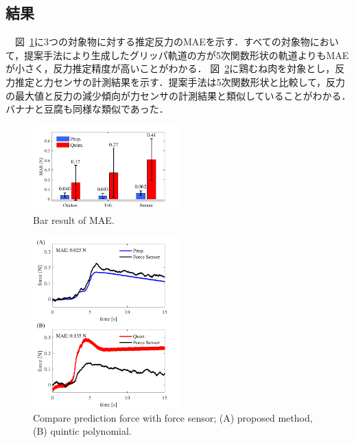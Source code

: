 \documentclass[a4paper]{jarticle}
\begin{document}
\subsection{結果}
　図~\ref{fig:bar_result}に3つの対象物に対する推定反力のMAEを示す．すべての対象物において，提案手法により生成したグリッパ軌道の方が5次関数形状の軌道よりもMAEが小さく，反力推定精度が高いことがわかる．
図~\ref{fig:prop_quint}に鶏むね肉を対象とし，反力推定と力センサの計測結果を示す．提案手法は5次関数形状と比較して，反力の最大値と反力の減少傾向が力センサの計測結果と類似していることがわかる．
バナナと豆腐も同様な類似であった．
\begin{figure}[tb]
    \centering
    \includegraphics[width=0.5\textwidth]{bar_result.pdf}
    \caption{Bar result of MAE.}  
    \label{fig:bar_result}
\end{figure}
\begin{figure}[tb]
    \centering
    \includegraphics[width=0.5\textwidth]{prop_quint.pdf}
    \captionsetup{width=0.9\linewidth} %
    \caption{Compare prediction force with force sensor; (A) proposed method, (B) quintic polynomial.}
    \label{fig:prop_quint}
\end{figure}
\end{document}
